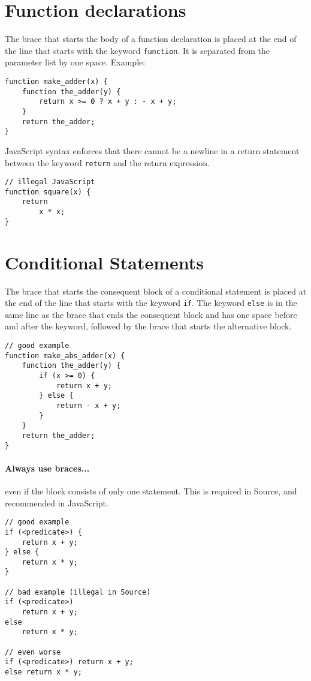 \vspace{-4mm}

\section*{Function declarations}

The brace that starts the body of a function declaration is placed at the end of the line that
starts with the keyword \lstinline{function}. It is separated from the parameter list by one
space.
Example:
\begin{lstlisting}
function make_adder(x) {
    function the_adder(y) {
        return x >= 0 ? x + y : - x + y;
    }
    return the_adder;
}
\end{lstlisting}
%
JavaScript syntax enforces that there cannot be a newline in a return statement
between the keyword \lstinline{return} and the return expression.

\begin{lstlisting}
// illegal JavaScript
function square(x) {
    return
        x * x;
}
\end{lstlisting}

\section*{Conditional Statements}

The brace that starts the consequent block of a conditional statement
is placed at the end of the line that starts with the keyword \lstinline{if}.
The keyword \lstinline{else} is in the same line as the brace that ends the
consequent block and has one space before and after the keyword, followed by
the brace that starts the alternative block.
%
\begin{lstlisting}
// good example
function make_abs_adder(x) {
    function the_adder(y) {
        if (x >= 0) {
            return x + y;
        } else {
            return - x + y;
        }
    }
    return the_adder;
}
\end{lstlisting}

\paragraph{Always use braces...} even if the block consists of only 
  one statement. This is required in Source, and recommended in JavaScript.

\begin{lstlisting}
// good example
if (<predicate>) {
    return x + y;
} else {
    return x * y;
}

// bad example (illegal in Source)
if (<predicate>) 
    return x + y;
else 
    return x * y;

// even worse
if (<predicate>) return x + y;
else return x * y;
\end{lstlisting}

